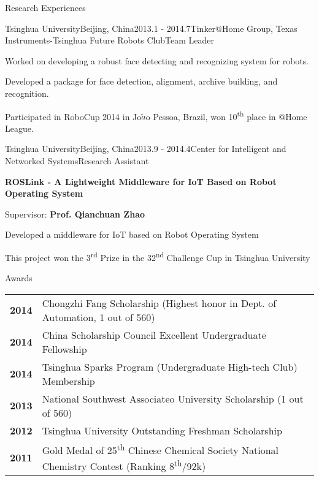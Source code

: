 \documentclass{resume} %
\begin{document}
\begin{rSection}{Research Experiences}
\newpage

\begin{rSubsection}{Tsinghua University}{Beijing, China}{2013.1 - 2014.7}{Tinker@Home Group, Texas Instruments-Tsinghua Future Robots Club}{Team Leader}

\item Worked on developing a robust face detecting and recognizing system for robots.
\item Developed a package for face detection, alignment, archive building, and recognition.
\item Participated in RoboCup 2014 in Jo$\tilde{a}$o Pessoa, Brazil, won 10\textsuperscript{th} place in @Home League.	
\end{rSubsection}

\begin{rSubsection}{Tsinghua University}{Beijing, China}{2013.9 - 2014.4}{Center for Intelligent and Networked Systems}{Research Assistant}
\item {\bf ROSLink - A Lightweight Middleware for IoT Based on Robot Operating System}
\item Supervisor: {\bf Prof. Qianchuan Zhao}
\item Developed a middleware for IoT based on Robot Operating System
\item This project won the 3\textsuperscript{rd} Prize in the 32\textsuperscript{nd} Challenge Cup in Tsinghua University

\end{rSubsection}




\end{rSection}



\begin{rSection}{Awards}

\begin{tabular}{ @{} >{\bfseries}l @{\hspace{3ex}} l }
2014 & Chongzhi Fang Scholarship (Highest honor in Dept. of Automation, 1 out of 560) \\
2014 & China Scholarship Council Excellent Undergraduate Fellowship \\
2014 &Tsinghua Sparks Program (Undergraduate High-tech Club) Membership \\

2013 & National Southwest Associateo University Scholarship (1 out of 560) \\
2012 & Tsinghua University Outstanding Freshman Scholarship \\
2011 & Gold Medal of 25\textsuperscript{th} Chinese Chemical Society National Chemistry Contest (Ranking 8\textsuperscript{th}/92k)
\end{tabular}

\end{rSection}
\end{document}
